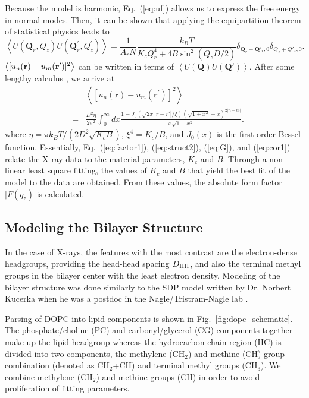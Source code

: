 Because the model is harmonic, Eq.~(\ref{eq:uf}) allows us to express the 
free energy in normal modes. Then, it can be shown that
applying the equipartition theorem of statistical physics leads to 
\begin{equation}
  \left\langle U\left(\mathbf{Q}_{r},Q_{z}\right)U\left(\mathbf{Q}_{r}^{\prime },Q_{z}^{\prime }\right)\right\rangle =\frac{1}{A_{r}N}\frac{k_{B}T}{K_{c}Q_{r}^{4}+4B\sin ^{2}\left(Q_{z}D/2\right)}\delta _{\mathbf{Q}_{r}+\mathbf{Q}'_{r},0}\delta _{Q_{z}+Q'_{z},0}.
  \label{eq:mode}
\end{equation}
$\left\langle\mathopen{}\left[ u_n(\mathbf{r})-u_m(\mathbf{r'}) \right]\mathclose{}^2\right\rangle$ can 
be written in terms of $\left\langle U(\mathbf{Q})U(\mathbf{Q'}) \right\rangle$.
After some lengthy calculus \cite{Liu03}, we arrive at
\begin{eqnarray}
  &  & \left\langle \left[u_{n}\left(\mathbf{r}\right)-u_{m}\left(\mathbf{r}^{\prime }\right)\right]^{2}\right\rangle \nonumber \\
  & = & \frac{D^{2}\eta }{2\pi ^{2}}\int _{0}^{\infty }dx\frac{1-J_{0}\left(\sqrt{2x}\left|r-r'\right|/\xi \right)\left(\sqrt{1+x^{2}}-x\right)^{2\left|n-m\right|}}{x\sqrt{1+x^{2}}}.
  \label{eq:cor1}
\end{eqnarray}
where $\eta=\pi k_BT/(2D^2\sqrt{K_cB})$, $\xi^4=K_c/B$, and $J_0(x)$ is the 
first order Bessel function. 
Essentially, Eq.~(\ref{eq:factor1}), (\ref{eq:struct2}), (\ref{eq:G}), and (\ref{eq:cor1}) relate
the X-ray data to the material parameters, $K_c$ and $B$. Through
a non-linear least square fitting, the values of $K_c$ and $B$ that yield the
best fit of the model to the data are obtained. From these values, the absolute
form factor $|F(q_z)$ is calculated.

\newpage
\subsection{Modeling the Bilayer Structure}\label{sec:SDP_method}
In the case of X-rays, the features with the most contrast are the 
electron-dense headgroups, providing the head-head spacing $D_\textrm{HH}$,
and also the terminal methyl groups in the bilayer center with the least 
electron density.
Modeling of the bilayer structure was done similarly to the SDP model 
written by Dr. Norbert Kucerka when he was a postdoc in the 
Nagle/Tristram-Nagle lab \cite{Kucerka08}. 

Parsing of DOPC into lipid components is shown in
Fig.~\ref{fig:dopc_schematic}. The phosphate/choline (PC) and 
carbonyl/glycerol (CG) components together make up the lipid headgroup
whereas the hydrocarbon chain region (HC)
is divided into two components, the methylene (CH$_2$) and methine (CH) group
combination (denoted as CH$_2$+CH) and terminal methyl groups (CH$_3$). 
We combine methylene (CH$_2$) and methine groups (CH) in order to avoid 
proliferation of fitting parameters.

